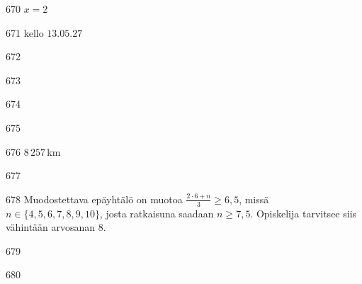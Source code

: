 \begin{Vastaus}{670}
		$x=2$
    
\end{Vastaus}
\begin{Vastaus}{671}
		kello $13.05.27$
    
\end{Vastaus}
\begin{Vastaus}{672}
    
\end{Vastaus}
\begin{Vastaus}{673}

	
\end{Vastaus}
\begin{Vastaus}{674}
    
\end{Vastaus}
\begin{Vastaus}{675}
	
\end{Vastaus}
\begin{Vastaus}{676}
        $8\,257$\,km
    
\end{Vastaus}
\begin{Vastaus}{677}
    
\end{Vastaus}
\begin{Vastaus}{678}
Muodostettava epäyhtälö on muotoa $\frac{2\cdot 6+n}{3}\geq 6,5$, missä $n \in \lbrace 4,5,6,7,8,9,10 \rbrace$, josta ratkaisuna saadaan $n\geq 7,5$. Opiskelija tarvitsee siis vähintään arvosanan $8$.
\end{Vastaus}
\begin{Vastaus}{679}
  
\end{Vastaus}
\begin{Vastaus}{680}
\end{Vastaus}
